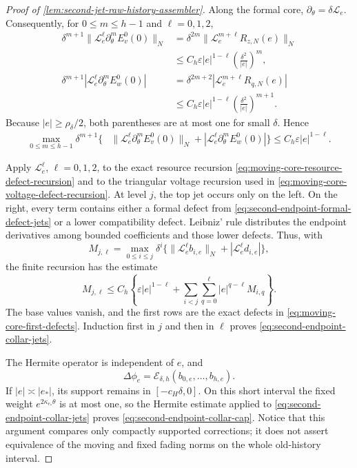 \begin{proof}[Proof of
\cref{lem:second-jet-raw-history-assembler}]
Along the formal core, \(\partial_\theta=\delta\mathcal L_e\).
Consequently, for \(0\le m\le h-1\) and \(\ell=0,1,2\),
\begin{align*}
 \delta^{m+1}
 \|\mathcal L_e^\ell\partial_\theta^mE_v^0(0)\|_N
 &=\delta^{2m}
   \|\mathcal L_e^{m+\ell}R_{z,N}(e)\|_N\\
 &\le C_h\varepsilon|e|^{1-\ell}
       \left(\frac{\delta^2}{|e|}\right)^m,\\
 \delta^{m+1}
 |\mathcal L_e^\ell\partial_\theta^mE_w^0(0)|
 &=\delta^{2m+2}
   |\mathcal L_e^{m+\ell}R_{q,N}(e)|\\
 &\le C_h\varepsilon|e|^{1-\ell}
       \left(\frac{\delta^2}{|e|}\right)^{m+1}.
\end{align*}
Because \(|e|\ge\rho_\delta/2\), both parentheses are at most one for
small \(\delta\).  Hence
\begin{align}
 \max_{0\le m\le h-1}\delta^{m+1}
 \bigl\{&
  \|\mathcal L_e^\ell
          \partial_\theta^mE_v^0(0)\|_N
 +|\mathcal L_e^\ell
          \partial_\theta^mE_w^0(0)|\bigr\}
 \le C_h\varepsilon |e|^{1-\ell}.                \label{eq:second-endpoint-formal-defect-jets}
\end{align}

Apply \(\mathcal L_e^\ell\), \(\ell=0,1,2\), to the exact resource
recursion
\cref{eq:moving-core-resource-defect-recursion} and to the triangular
voltage recursion used in
\cref{eq:moving-core-voltage-defect-recursion}.  At level \(j\), the
top jet occurs only on the left.  On the right, every term contains either
a formal defect from
\cref{eq:second-endpoint-formal-defect-jets} or a lower compatibility
defect.  Leibniz' rule distributes the endpoint derivatives among bounded
coefficients and those lower defects.  Thus, with
\[
 M_{j,\ell}
 =\max_{0\le i\le j}\delta^i
   \{\|\mathcal L_e^\ell b_{i,e}\|_N
                   +|\mathcal L_e^\ell d_{i,e}|\},
\]
the finite recursion has the estimate
\begin{equation}
 M_{j,\ell}\le C_h\left\{
   \varepsilon|e|^{1-\ell}
  +\sum_{i<j}\sum_{q=0}^{\ell}
       |e|^{q-\ell}M_{i,q}\right\}.               \label{eq:second-endpoint-triangular-induction}
\end{equation}
The base values vanish, and the first rows are the exact defects in
\cref{eq:moving-core-first-defects}.  Induction first in \(j\) and then
in \(\ell\) proves
\cref{eq:second-endpoint-collar-jets}.

The Hermite operator is independent of \(e\), and
\[
 \Delta\phi_e
 =\mathcal E_{\delta,h}(b_{0,e},\ldots,b_{h,e}).
\]
If \(|e|\asymp|e_*|\), its support remains in
\([-c_H\delta,0]\).  On this short interval the fixed weight
\(e^{2\kappa_{e_*}\theta}\) is at most one, so the Hermite estimate applied
to
\cref{eq:second-endpoint-collar-jets} proves
\cref{eq:second-endpoint-collar-cap}.  Notice that this argument compares
only compactly supported corrections; it does not assert equivalence of
the moving and fixed fading norms on the whole old-history interval.


\end{proof}

